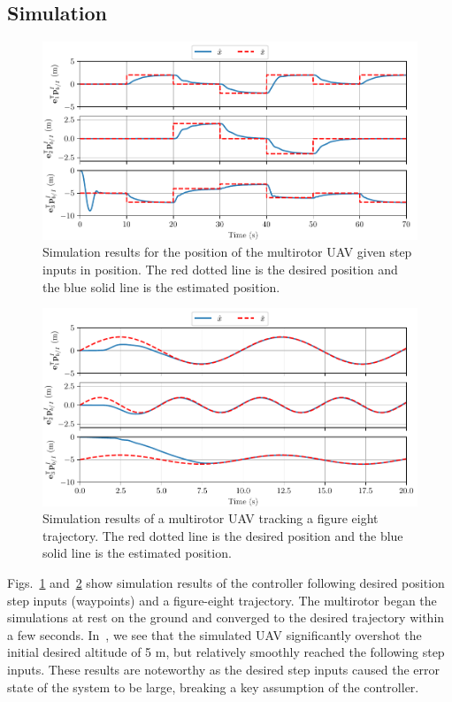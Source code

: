 
\subsection{Simulation}

\begin{figure}
  \centering
  \includegraphics[width=6.5in]{figures/sim_wps_position}
  \caption[LQR Simulation Results Flying Waypoints]{Simulation results for the position of the multirotor UAV given step
  inputs in position. The red dotted line is the desired position and the blue
solid line is the estimated position.}
  \label{f:sim_wps}
\end{figure}

\begin{figure}
  \centering
  \includegraphics[width=6.5in]{figures/sim_fig8_position}
  \caption[LQR Simulation Results Flying a Trajectory]{Simulation results of a multirotor UAV tracking a figure eight
  trajectory. The red dotted line is the desired position and the blue solid
line is the estimated position.}
  \label{f:sim_fig8}
\end{figure}

Figs.~\ref{f:sim_wps} and~\ref{f:sim_fig8} show simulation results of the
controller following desired position step inputs (waypoints) and a figure-eight trajectory. The
multirotor began the simulations at rest on the ground and converged to the
desired trajectory within a few seconds. In~, we see that the
simulated UAV significantly overshot the initial desired altitude of 5 m, but
relatively smoothly reached the following step inputs. These results are
noteworthy as the desired step inputs caused the error state of the system to be
large, breaking a key assumption of the controller.

